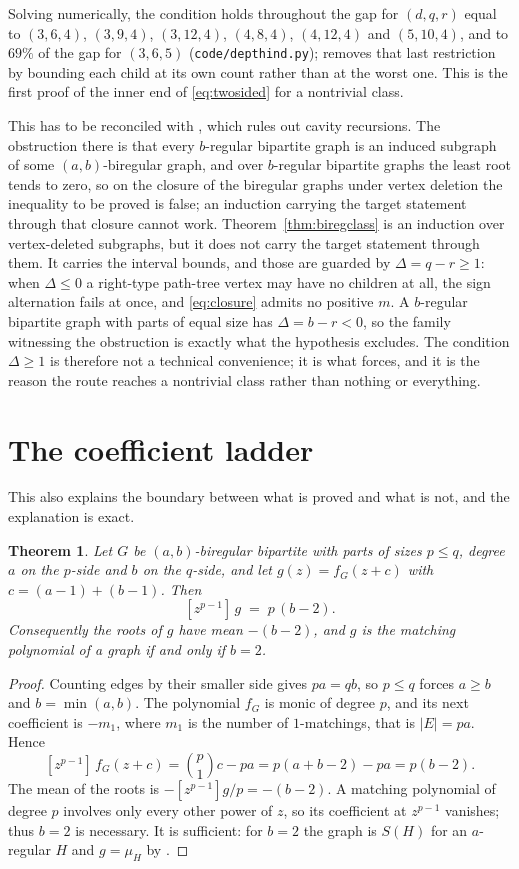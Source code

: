 \documentclass[11pt]{article}
\newtheorem{theorem}{Theorem}
\theoremstyle{remark}
\begin{document}
Solving numerically, the condition holds throughout the gap for $(d,q,r)$ equal to $(3,6,4)$,
$(3,9,4)$, $(3,12,4)$, $(4,8,4)$, $(4,12,4)$ and $(5,10,4)$, and to $69\%$ of the gap for
$(3,6,5)$ (\texttt{code/depthind.py}); \cite{Supp2} removes that last restriction by
bounding each child at its own count rather than at the worst one. This is the first proof of the
inner end of \eqref{eq:twosided} for a nontrivial class.

This has to be reconciled with \cite{Supp2}, which rules out cavity recursions. The
obstruction there is that every $b$-regular bipartite graph is an induced subgraph of some
$(a,b)$-biregular graph, and over $b$-regular bipartite graphs the least root tends to zero, so
on the closure of the biregular graphs under vertex deletion the inequality to be proved is
false; an induction carrying the target statement through that closure cannot work.
Theorem~\ref{thm:biregclass} is an induction over vertex-deleted subgraphs, but it does not carry
the target statement through them. It carries the interval bounds, and those are guarded by
$\Delta=q-r\ge1$: when $\Delta\le0$ a right-type path-tree vertex may have no children at all,
the sign alternation fails at once, and \eqref{eq:closure} admits no positive $m$. A $b$-regular
bipartite graph with parts of equal size has $\Delta=b-r<0$, so the family witnessing the
obstruction is exactly what the hypothesis excludes. The condition $\Delta\ge1$ is therefore not
a technical convenience; it is what \cite{Supp2} forces, and it is the reason the route
reaches a nontrivial class rather than nothing or everything.

\section{The coefficient ladder}

This also explains the boundary between what is proved and what is not, and the
explanation is exact.

\begin{theorem}\label{thm:subcoef}
Let $G$ be $(a,b)$-biregular bipartite with parts of sizes $p\le q$, degree $a$
on the $p$-side and $b$ on the $q$-side, and let $g(z)=f_G(z+c)$ with
$c=(a-1)+(b-1)$. Then
\[
[z^{p-1}]\,g \;=\; p\,(b-2).
\]
Consequently the roots of $g$ have mean $-(b-2)$, and $g$ is the matching
polynomial of a graph if and only if $b=2$.
\end{theorem}

\begin{proof}
Counting edges by their smaller side gives $pa=qb$, so $p\le q$ forces $a\ge b$
and $b=\min(a,b)$. The polynomial $f_G$ is monic of degree $p$, and its next
coefficient is $-m_1$, where $m_1$ is the number of $1$-matchings, that is
$|E|=pa$. Hence
\[
[z^{p-1}]\,f_G(z+c)=\binom{p}{1}c-pa=p(a+b-2)-pa=p(b-2).
\]
The mean of the roots is $-[z^{p-1}]g/p=-(b-2)$. A matching polynomial of
degree $p$ involves only every other power of $z$, so its coefficient at
$z^{p-1}$ vanishes; thus $b=2$ is necessary. It is sufficient: for $b=2$ the
graph is $S(H)$ for an $a$-regular $H$ and $g=\mu_H$ by \cite{YY}.
\end{proof}
\end{document}
